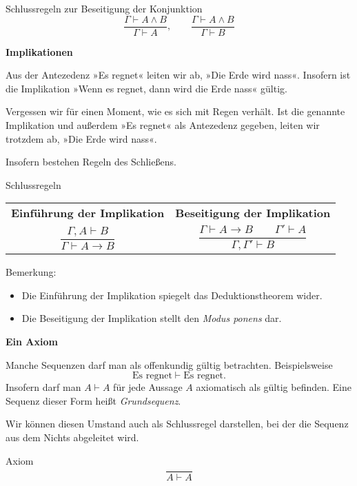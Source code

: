 \documentclass[8pt]{beamer}
\newcommand{\strong}[1]{\textsf{\textbf{#1}}}
\newcommand{\centerheadline}[1]{%
  \begin{center}\strong{#1}\end{center}}
\newcommand{\parspace}{\vspace{0.8em}}
\newcommand{\cond}{\rightarrow}
\begin{document}
\begin{frame}
\begin{block}{Schlussregeln zur Beseitigung der Konjunktion}
\[\dfrac{\Gamma\vdash A\land B}{\Gamma\vdash A},\qquad
\dfrac{\Gamma\vdash A\land B}{\Gamma\vdash B}\]
\end{block}
\end{frame}

\begin{frame}
\centerheadline{Implikationen}
\end{frame}

\begin{frame}
Aus der Antezedenz »Es regnet« leiten wir ab, »Die Erde wird nass«.
Insofern ist die Implikation »Wenn es regnet, dann wird die Erde
nass« gültig.\pause

\parspace
Vergessen wir für einen Moment, wie es sich mit Regen verhält.
Ist die genannte Implikation und außerdem »Es regnet« als
Antezedenz gegeben, leiten wir trotzdem ab, »Die Erde wird nass«.\pause

\parspace
Insofern bestehen Regeln des Schließens.
\begin{block}{Schlussregeln}
\begin{center}
\begin{tabular}{c@{\qquad\quad}c}
\strong{\small Einführung der Implikation}
& \strong{\small Beseitigung der Implikation}\\[6pt]
$\dfrac{\Gamma,A\vdash B}{\Gamma\vdash A\cond B}$
& $\dfrac{\Gamma\vdash A\cond B\qquad\Gamma'\vdash A}{\Gamma,\Gamma'\vdash B}$\\
\end{tabular}
\end{center}
\end{block}\pause

\parspace
Bemerkung:
\begin{itemize}
\item Die Einführung der Implikation spiegelt das Deduktionstheorem wider.
\item Die Beseitigung der Implikation stellt den \emph{Modus ponens} dar.
\end{itemize}
\end{frame}

\begin{frame}
\centerheadline{Ein Axiom}
\end{frame}

\begin{frame}
Manche Sequenzen darf man als offenkundig gültig betrachten. Beispielsweise
\[\text{Es regnet}\vdash\text{Es regnet}.\]\pause
Insofern darf man $A\vdash A$ für jede Aussage $A$
axiomatisch als gültig befinden. Eine Sequenz dieser Form heißt
\emph{Grundsequenz}.\pause

\parspace
Wir können diesen Umstand auch als Schlussregel darstellen, bei der
die Sequenz aus dem Nichts abgeleitet wird.
\begin{block}{Axiom}
\[\dfrac{}{A\vdash A}\]
\end{block}
\end{frame}
\end{document}
